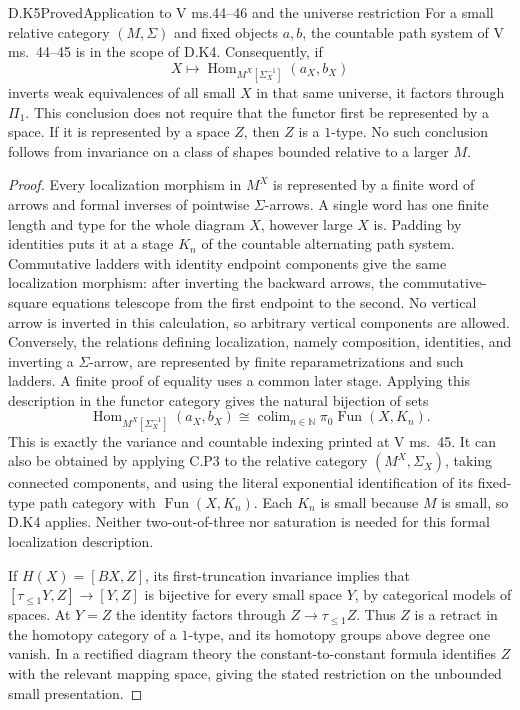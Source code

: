 \begin{result}{D.K5}{Proved}{Application to V ms.44--46 and the universe restriction}
For a small relative category $(M,\Sigma)$ and fixed objects $a,b$,
the countable path system of V ms.~44--45 is in the scope of D.K4.
Consequently, if
\[
 X\longmapsto
 \operatorname{Hom}_{M^X[\Sigma_X^{-1}]}(a_X,b_X)
\]
inverts weak equivalences of all small $X$ in that same universe,
it factors through $\Pi_1$. This conclusion does not require that
the functor first be represented by a space. If it is represented
by a space $Z$, then $Z$ is a $1$-type. No such conclusion follows
from invariance on a class of shapes bounded relative to a larger
$M$.
\end{result}
\begin{proof}
Every localization morphism in $M^X$ is represented by a finite
word of arrows and formal inverses of pointwise $\Sigma$-arrows.
A single word has one finite length and type for the whole
diagram $X$, however large $X$ is. Padding by identities puts
it at a stage $K_n$ of the countable alternating path system.
Commutative ladders with identity endpoint components give
the same localization morphism: after inverting the backward
arrows, the commutative-square equations telescope from the
first endpoint to the second. No vertical arrow is inverted in
this calculation, so arbitrary vertical components are allowed.
Conversely, the relations
defining localization, namely composition, identities, and
inverting a $\Sigma$-arrow, are represented by finite
reparametrizations and such ladders. A finite proof of equality
uses a common later stage. Applying this description in the
functor category gives the natural bijection of sets
\[
 \operatorname{Hom}_{M^X[\Sigma_X^{-1}]}(a_X,b_X)
       \cong\operatorname{colim}_{n\in\mathbb N}
                      \pi_0\operatorname{Fun}(X,K_n).
\]
This is exactly the variance and countable indexing printed
at V ms.~45. It can also be obtained by applying C.P3 to the
relative category $(M^X,\Sigma_X)$, taking connected components,
and using the literal exponential identification of its
fixed-type path category with $\operatorname{Fun}(X,K_n)$.
Each $K_n$ is small because $M$ is small, so
D.K4 applies. Neither two-out-of-three nor saturation is
needed for this formal localization description.

If $H(X)=[BX,Z]$, its first-truncation invariance implies that
$[\tau_{\leq1}Y,Z]\to[Y,Z]$ is bijective for every small
space $Y$, by categorical models of spaces. At $Y=Z$ the
identity factors through $Z\to\tau_{\leq1}Z$. Thus $Z$ is a
retract in the homotopy category of a $1$-type, and its
homotopy groups above degree one vanish. In a rectified
diagram theory the constant-to-constant formula identifies
$Z$ with the relevant mapping space, giving the stated
restriction on the unbounded small presentation.


\end{proof}
